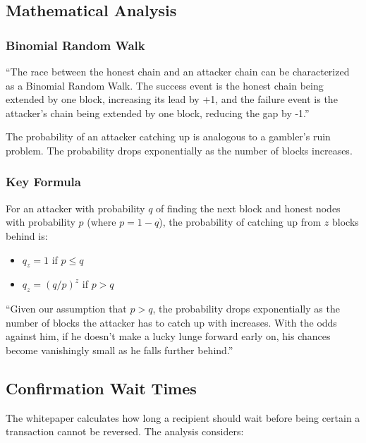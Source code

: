 \subsection{Mathematical Analysis}
\label{subsec:math-analysis}

\subsubsection{Binomial Random Walk}

``The race between the honest chain and an attacker chain can be characterized as a Binomial Random Walk. The success event is the honest chain being extended by one block, increasing its lead by +1, and the failure event is the attacker's chain being extended by one block, reducing the gap by -1.''

The probability of an attacker catching up is analogous to a gambler's ruin problem. The probability drops exponentially as the number of blocks increases.

\subsubsection{Key Formula}

For an attacker with probability $q$ of finding the next block and honest nodes with probability $p$ (where $p = 1 - q$), the probability of catching up from $z$ blocks behind is:

\begin{itemize}
  \item $q_z = 1$ if $p \le q$
  \item $q_z = (q/p)^z$ if $p > q$
\end{itemize}

``Given our assumption that $p>q$, the probability drops exponentially as the number of blocks the attacker has to catch up with increases. With the odds against him, if he doesn't make a lucky lunge forward early on, his chances become vanishingly small as he falls further behind.''

\subsection{Confirmation Wait Times}
\label{subsec:confirmation-times}

The whitepaper calculates how long a recipient should wait before being certain a transaction cannot be reversed. The analysis considers:

